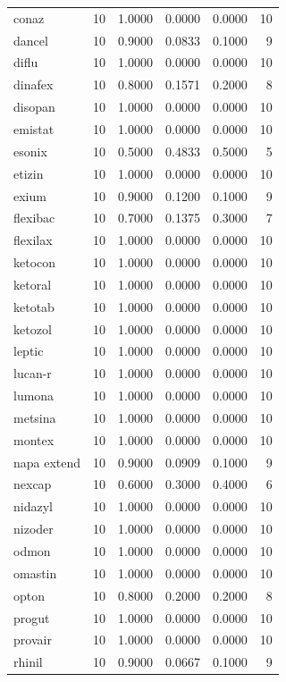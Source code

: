 \begin{longtable}{p{3.0cm}rrrrr}
conaz & 10 & 1.0000 & 0.0000 & 0.0000 & 10 \\
dancel & 10 & 0.9000 & 0.0833 & 0.1000 & 9 \\
diflu & 10 & 1.0000 & 0.0000 & 0.0000 & 10 \\
dinafex & 10 & 0.8000 & 0.1571 & 0.2000 & 8 \\
disopan & 10 & 1.0000 & 0.0000 & 0.0000 & 10 \\
emistat & 10 & 1.0000 & 0.0000 & 0.0000 & 10 \\
esonix & 10 & 0.5000 & 0.4833 & 0.5000 & 5 \\
etizin & 10 & 1.0000 & 0.0000 & 0.0000 & 10 \\
exium & 10 & 0.9000 & 0.1200 & 0.1000 & 9 \\
flexibac & 10 & 0.7000 & 0.1375 & 0.3000 & 7 \\
flexilax & 10 & 1.0000 & 0.0000 & 0.0000 & 10 \\
ketocon & 10 & 1.0000 & 0.0000 & 0.0000 & 10 \\
ketoral & 10 & 1.0000 & 0.0000 & 0.0000 & 10 \\
ketotab & 10 & 1.0000 & 0.0000 & 0.0000 & 10 \\
ketozol & 10 & 1.0000 & 0.0000 & 0.0000 & 10 \\
leptic & 10 & 1.0000 & 0.0000 & 0.0000 & 10 \\
lucan-r & 10 & 1.0000 & 0.0000 & 0.0000 & 10 \\
lumona & 10 & 1.0000 & 0.0000 & 0.0000 & 10 \\
metsina & 10 & 1.0000 & 0.0000 & 0.0000 & 10 \\
montex & 10 & 1.0000 & 0.0000 & 0.0000 & 10 \\
napa extend & 10 & 0.9000 & 0.0909 & 0.1000 & 9 \\
nexcap & 10 & 0.6000 & 0.3000 & 0.4000 & 6 \\
nidazyl & 10 & 1.0000 & 0.0000 & 0.0000 & 10 \\
nizoder & 10 & 1.0000 & 0.0000 & 0.0000 & 10 \\
odmon & 10 & 1.0000 & 0.0000 & 0.0000 & 10 \\
omastin & 10 & 1.0000 & 0.0000 & 0.0000 & 10 \\
opton & 10 & 0.8000 & 0.2000 & 0.2000 & 8 \\
progut & 10 & 1.0000 & 0.0000 & 0.0000 & 10 \\
provair & 10 & 1.0000 & 0.0000 & 0.0000 & 10 \\
rhinil & 10 & 0.9000 & 0.0667 & 0.1000 & 9 \\

\end{longtable}
